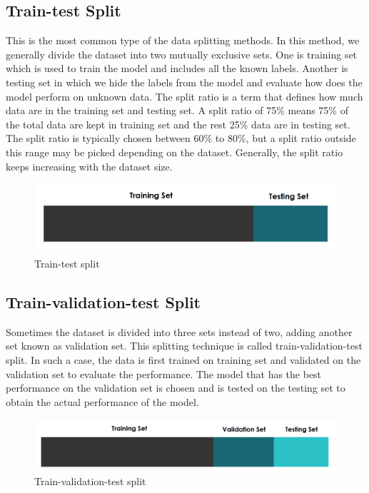 \subsection{Train-test Split}
This is the most common type of the data splitting methods. In this method, we generally divide the dataset into two mutually exclusive sets. One is training set which is used to train the model and includes all the known labels. Another is testing set in which we hide the labels from the model and evaluate how does the model perform on unknown data. The split ratio is a term that defines how much data are in the training set and testing set. A split ratio of 75\% means 75\% of the total data are kept in training set and the rest 25\% data are in testing set. The split ratio is typically chosen between 60\% to 80\%, but a split ratio outside this range may be picked depending on the dataset. Generally, the split ratio keeps increasing with the dataset size.

\begin{figure}[H]
\centering
\includegraphics[width=1.0\textwidth]{./figure/chap 5/Train_test_split.png}
\caption{Train-test split}
\label{Fig 5.2}
\end{figure}

\subsection{Train-validation-test Split}
Sometimes the dataset is divided into three sets instead of two, adding another set known as validation set. This splitting technique is called train-validation-test split. In such a case, the data is first trained on training set and validated on the validation set to evaluate the performance. The model that has the best performance on the validation set is chosen and is tested on the testing set to obtain the actual performance of the model. 

\begin{figure}[H]
\centering
\includegraphics[width=1.0\textwidth]{./figure/chap 5/Train_val_test_split.png}
\caption{Train-validation-test split}
\label{Fig 5.3}
\end{figure}

